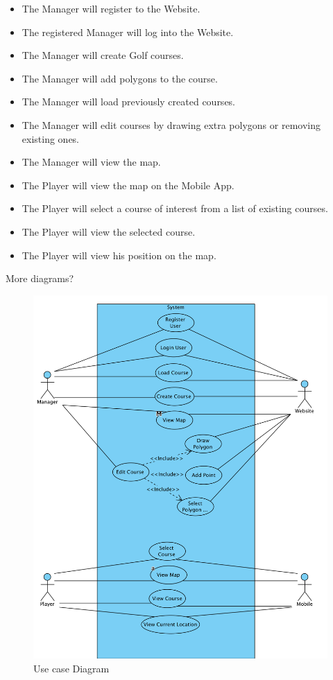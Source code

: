 \documentclass{article}
\begin{document}
    \begin{itemize}
        \item
            The Manager will register to the Website.
        \item
            The registered Manager will log into the Website.
        \item
            The Manager will create Golf courses.
        \item
            The Manager will add polygons to the course.
        \item
            The Manager will load previously created courses.
        \item
            The Manager will edit courses by drawing extra polygons or removing existing ones.
        \item
        	The Manager will view the map.
        \item
            The Player will view the map on the Mobile App.
        \item
            The Player will select a course of interest  from a list of existing courses.
        \item
            The Player will view the selected course.
        \item
        	The Player will view his position on the map.
    \end{itemize}
    
    More diagrams?

    \begin{figure}[h]
    \centering
    \includegraphics[scale=0.6]{UsecaseDiagram}
    \caption{Use case Diagram}
    \label{fig:usecase1}
    \end{figure}
\end{document}

